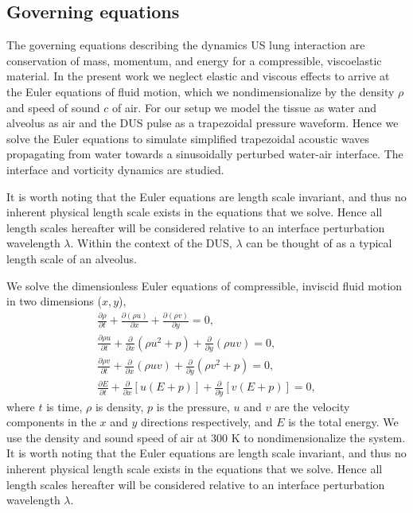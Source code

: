 \subsection{Governing equations}%
\label{subsec:usbe_lung_goveq}%
The governing equations describing the dynamics \ac{US} lung
interaction are conservation of mass, momentum, and energy for a
compressible, viscoelastic material. In the present work we neglect
elastic and viscous effects to arrive at the Euler equations of fluid
motion, which we nondimensionalize by the density $\rho$ and speed of
sound $c$ of air.  For our setup we model the tissue as water and
alveolus as air and the \ac{DUS} pulse as a trapezoidal pressure
waveform. Hence we solve the Euler equations to simulate simplified
trapezoidal acoustic waves propagating from water towards a
sinusoidally perturbed water-air interface. The interface and
vorticity dynamics are studied.

It is worth noting that the Euler equations are length scale invariant, and
thus no inherent physical length scale exists in the equations that we
solve. Hence all length scales hereafter will be considered relative
to an interface perturbation wavelength $\lambda$. Within the context
of the \ac{DUS}, $\lambda$ can be thought of as a typical length scale
of an alveolus.

We solve the dimensionless Euler equations of compressible, inviscid
fluid motion in two dimensions ($x,y$),
%
\begin{subequations} \label{eq:euler}%
  \begin{align}%
    \frac{\partial \rho}{\partial t} + \frac{\partial \left(\rho u\right)}{\partial x} + \frac{\partial \left(\rho v\right)}{\partial y} = 0,\\
    \frac{\partial \rho u}{\partial t} + \frac{\partial}{\partial x}\left( \rho u^2+p\right)  + \frac{\partial}{\partial y}\left( \rho uv\right) = 0,\\
    \frac{\partial \rho v}{\partial t} + \frac{\partial}{\partial x}\left( \rho uv\right)  + \frac{\partial}{\partial y}\left( \rho v^2+p\right) = 0,\\
    \frac{\partial E}{\partial t} + \frac{\partial}{\partial x}\left[u\left(E+p\right)\right] + \frac{\partial}{\partial y}\left[v\left(E+p\right)\right] = 0,
  \end{align}%
\end{subequations}%
%
where $t$ is time, $\rho$ is density, $p$ is the pressure, $u$ and $v$
are the velocity components in the $x$ and $y$ directions
respectively, and $E$ is the total energy. We use the density and
sound speed of air at 300 K to nondimensionalize the system. It is
worth noting that the Euler equations are length scale invariant, and
thus no inherent physical length scale exists in the equations that we
solve. Hence all length scales hereafter will be considered relative
to an interface perturbation wavelength $\lambda$.

